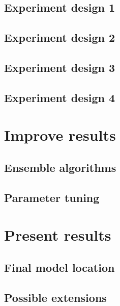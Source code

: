 \section{Experiment design 1}
\section{Experiment design 2}
\section{Experiment design 3}
\section{Experiment design 4}

\chapter{Improve results}

\section{Ensemble algorithms}
\section{Parameter tuning}

\chapter{Present results}
\section{Final model location}
\section{Possible extensions}